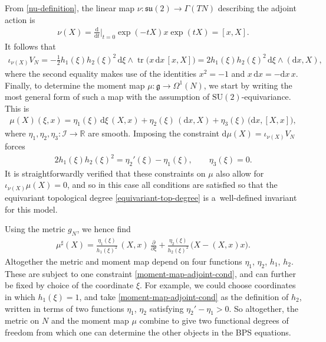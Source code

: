 \documentclass[10pt,a4paper]{amsart}
\newcommand{\II}{{\mathcal{I}}}
\newcommand{\g}{{\mathfrak{g}}}
\newcommand{\su}{{\mathfrak{su}}}
\newcommand{\SU}{{\mathrm{SU}}}
\newcommand{\R}{{\mathbb{R}}}
\newcommand{\1}{{\mathbb{1}}}
\newcommand{\bdy}{\partial}
\def \d{\mathrm{d}}
\newcommand{\tr}{{\operatorname{tr}}}
\numberwithin{equation}{section}
\begin{document}
From \eqref{nu-definition}, the linear map $\nu\colon \su(2)\to \Gamma(TN)$ describing the adjoint action is
\begin{align}
 \nu(X)=\frac{\d}{\d t}\Big|_{t=0}\exp(-tX)x\exp(tX)=[x,X].\label{adjoint-action}
\end{align}
It follows that
\begin{align*}
 \iota_{\nu(X)}V_N=-\tfrac{1}{2}h_1(\xi)h_2(\xi)^2\,\d\xi \wedge\tr\bigl(x\,\d x\, [x,X]\bigr) = 2h_1(\xi)h_2(\xi)^2\,\d\xi \wedge (\d x,X),
\end{align*}
where the second equality makes use of the identities $x^2=-1$ and $x\,\d x = -\d x\, x$. Finally, to determine the moment map $\mu\colon \g\to\Omega^1(N)$, we start by writing the most general form of such a map with the assumption of $\SU(2)$-equivariance. This is
\begin{align}\label{moment-map-adjoint}
 \mu(X)(\xi,x)=\eta_1(\xi)\,\d\xi\,(X,x)+\eta_2(\xi)\,(\d x,X)+\eta_3(\xi)\,\bigl(\d x,[X,x]\bigr),
\end{align}
where $\eta_1, \eta_2, \eta_3\colon \II\to\R$ are smooth. Imposing the constraint $\d\mu(X)=\iota_{\nu(X)}V_N$ forces
\begin{align}\label{moment-map-adjoint-cond}
 2h_1(\xi)h_2(\xi)^2=\eta_2'(\xi)-\eta_1(\xi),\qquad\eta_3(\xi)=0.
\end{align}
It is straightforwardly verified that these constraints on $\mu$ also allow for $\iota_{\nu(X)}\mu(X)=0$, and so in this case all conditions are satisfied so that the equivariant topological degree \eqref{equivariant-top-degree} is a~well-defined invariant for this model.

Using the metric $g_N$, we hence find
\begin{align}\label{sharped-moment-adjoint}
 \mu^\sharp(X)=\frac{\eta_1(\xi)}{h_1(\xi)^2}\,(X,x)\,
 \frac{\bdy}{\bdy\xi}+\frac{\eta_2(\xi)}{h_2(\xi)^2}\,\bigl(X-(X,x)x\bigr).
\end{align}
Altogether the metric and moment map depend on four functions $\eta_1$, $\eta_2$, $h_1$, $h_2$. These are subject to one constraint \eqref{moment-map-adjoint-cond}, and can further be fixed by choice of the coordinate $\xi$. For example, we could choose coordinates in which $h_1(\xi)=1$, and take \eqref{moment-map-adjoint-cond} as the definition of $h_2$, written in terms of two functions $\eta_1$, $\eta_2$ satisfying $\eta_2'-\eta_1>0$. So altogether, the metric on $N$ and the moment map $\mu$ combine to give two functional degrees of freedom from which one can determine the other objects in the BPS equations.
\end{document}
